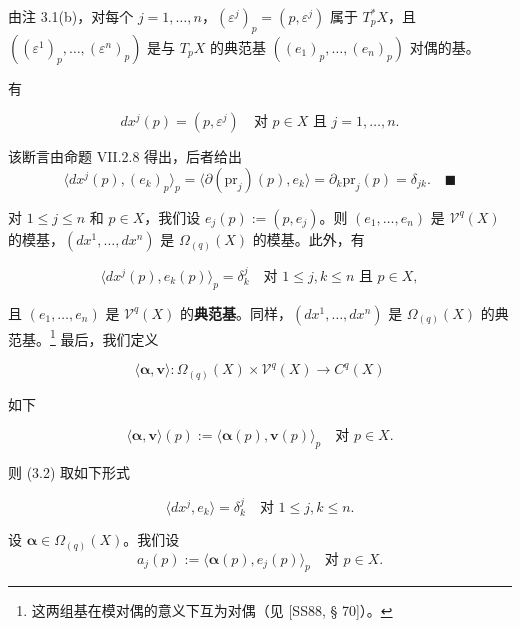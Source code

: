 \begin{remark}

\begin{items}
\item

由注 3.1(b)，对每个 $ j = 1,\ldots,n $，$ (\varepsilon^{j})_{p} = (p,\varepsilon^{j}) $ 属于 $ T_{p}^{*}X $，且 $ \left((\varepsilon^{1})_{p},\ldots,(\varepsilon^{n})_{p}\right) $ 是与 $ T_{p}X $ 的典范基 $ \left((e_{1})_{p},\ldots,(e_{n})_{p}\right) $ 对偶的基。

\item

有

\[
dx^{j}(p) = (p,\varepsilon^{j}) \quad \text{对 } p \in X \text{ 且 } j = 1,\ldots,n .
\]

\proofhead
该断言由命题 VII.2.8 得出，后者给出
\[
\langle dx^{j}(p),(e_{k})_{p}\rangle_{p} = \langle\partial(\mathrm{pr}_{j})(p),e_{k}\rangle = \partial_{k}\mathrm{pr}_{j}(p) = \delta_{jk} .\quad\blacksquare
\]
\item

对 $ 1 \le j \le n $ 和 $ p \in X $，我们设 $ e_{j}(p) := (p,e_{j}) $。则 $ (e_{1},\ldots,e_{n}) $ 是 $ \mathcal{V}^{q}(X) $ 的模基，$ (dx^{1},\ldots,dx^{n}) $ 是 $ \Omega_{(q)}(X) $ 的模基。此外，有

\begin{equation}
\langle dx^{j}(p),e_{k}(p)\rangle_{p} = \delta_{k}^{j} \quad \text{对 } 1 \le j,k \le n \text{ 且 } p \in X ,\tag{3.2}
\end{equation}

且 $ (e_{1},\ldots,e_{n}) $ 是 $ \mathcal{V}^{q}(X) $ 的\textbf{典范基}。同样，$ (dx^{1},\ldots,dx^{n}) $ 是 $ \Omega_{(q)}(X) $ 的典范基。\footnote{这两组基在模对偶的意义下互为对偶（见 [SS88, § 70]）。}
最后，我们定义

\[
\langle\boldsymbol{\alpha},\boldsymbol{v}\rangle : \Omega_{(q)}(X) \times \mathcal{V}^{q}(X) \to C^{q}(X)
\]

如下

\[
\langle\boldsymbol{\alpha},\boldsymbol{v}\rangle(p) := \langle\boldsymbol{\alpha}(p),\boldsymbol{v}(p)\rangle_{p} \quad \text{对 } p \in X .
\]

则 (3.2) 取如下形式

\[
\langle dx^{j},e_{k}\rangle = \delta_{k}^{j} \quad \text{对 } 1 \le j,k \le n .
\]

\proofhead
设 $ \boldsymbol{\alpha} \in \Omega_{(q)}(X) $。我们设
\[
a_{j}(p) := \langle\boldsymbol{\alpha}(p),e_{j}(p)\rangle_{p} \quad \text{对 } p \in X .
\]


\end{items}
\end{remark}

